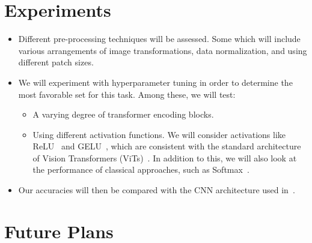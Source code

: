 \documentclass[10pt,twocolumn,letterpaper]{article}
\begin{document}
\section{Experiments}
\begin{itemize}

    \item Different pre-processing techniques will be assessed. Some which will include various arrangements of image transformations, data normalization, and using different patch sizes.
    
    \item We will experiment with hyperparameter tuning in order to determine the most favorable set for this task.  Among these, we will test:

    \begin{itemize}
    
        \item A varying degree of transformer encoding blocks. 

        \item Using different activation functions.  We will consider activations like ReLU~\cite{relu2010} and GELU~\cite{gelu2016}, which are consistent with the standard architecture of Vision Transformers (ViTs)~\cite{an_imageworth}.  In addition to this, we will also look at the performance of classical approaches, such as Softmax~\cite{softmax}.

        
    \end{itemize}

    \item Our accuracies will then be compared with the CNN architecture used in~\cite{ePill}.
\end{itemize}

\section{Future Plans}
\end{document}

